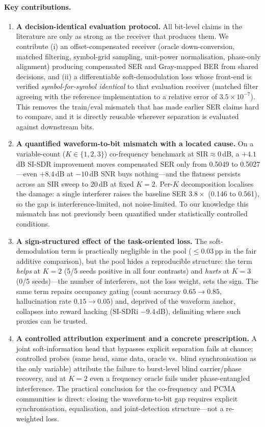 \documentclass[11pt,a4paper]{article}
\begin{document}
\paragraph{Key contributions.}
\begin{enumerate}
\item \textbf{A decision-identical evaluation protocol.} All bit-level
claims in the literature are only as strong as the receiver that
produces them. We contribute (i) an offset-compensated receiver
(oracle down-conversion, matched filtering, symbol-grid sampling,
unit-power normalisation, phase-only alignment) producing compensated
SER and Gray-mapped BER from shared decisions, and (ii) a
differentiable soft-demodulation loss whose front-end is verified
\emph{symbol-for-symbol identical} to that evaluation receiver
(matched filter agreeing with the reference implementation to a
relative error of $3.5\times10^{-7}$). This removes the train/eval
mismatch that has made earlier SER claims hard to compare, and it is
directly reusable wherever separation is evaluated against downstream
bits.
\item \textbf{A quantified waveform-to-bit mismatch with a located
cause.} On a variable-count ($K \in \{1,2,3\}$) co-frequency benchmark
at $\mathrm{SIR} \approx 0$\,dB, a $+4.1$\,dB SI-SDR improvement moves
compensated SER only from 0.5049 to 0.5027---even $+8.4$\,dB at
$-10$\,dB SNR buys nothing---and the flatness persists across an SIR
sweep to $20$\,dB at fixed $K{=}2$. Per-$K$ decomposition localises
the damage: a single interferer raises the baseline SER $3.8\times$
(0.146 to 0.561), so the gap is interference-limited, not
noise-limited. To our knowledge this mismatch has not previously been
quantified under statistically controlled conditions.
\item \textbf{A sign-structured effect of the task-oriented loss.} The
soft-demodulation term is practically negligible in the pool ($\leq
0.03$\,pp in the fair additive comparison), but the pool hides a
reproducible structure: the term \emph{helps} at $K{=}2$ (5/5 seeds
positive in all four contrasts) and \emph{hurts} at $K{=}3$ (0/5
seeds)---the number of interferers, not the loss weight, sets the
sign. The same term repairs occupancy gating (count accuracy
$0.65 \to 0.85$, hallucination rate $0.15 \to 0.05$) and, deprived of
the waveform anchor, collapses into reward hacking (SI-SDRi
$-9.4$\,dB), delimiting where such proxies can be trusted.
\item \textbf{A controlled attribution experiment and a concrete
prescription.} A joint soft-information head that bypasses explicit
separation fails at chance; controlled probes (same head, same data,
oracle vs.\ blind synchronisation as the only variable) attribute the
failure to burst-level blind carrier/phase recovery, and at $K{=}2$
even a frequency oracle fails under phase-entangled interference. The
practical conclusion for the co-frequency and PCMA communities is
direct: closing the waveform-to-bit gap requires explicit
synchronisation, equalisation, and joint-detection structure---not a
re-weighted loss.
\end{enumerate}
\end{document}
